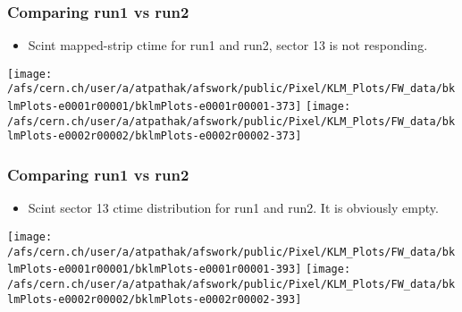 \documentclass{beamer}
\begin{document}
\begin{frame}
\frametitle{Comparing run1 vs run2}
\vspace*{.05cm}

\begin{itemize} 
\item {\small Scint mapped-strip ctime for run1 and run2, sector 13 is not responding.}
\end{itemize}

\begin{center}
\begin{normalsize}

\vspace*{-.2cm}
\begin{center}

\texttt{[image: /afs/cern.ch/user/a/atpathak/afswork/public/Pixel/KLM\_Plots/FW\_data/bklmPlots-e0001r00001/bklmPlots-e0001r00001-373]}
\texttt{[image: /afs/cern.ch/user/a/atpathak/afswork/public/Pixel/KLM\_Plots/FW\_data/bklmPlots-e0002r00002/bklmPlots-e0002r00002-373]} \\

\end{center}
\end{normalsize}
\end{center}
\end{frame}
\begin{frame}
\frametitle{Comparing run1 vs run2}
\vspace*{.05cm}

\begin{itemize} 
\item {\small Scint sector 13 ctime distribution for run1 and run2. It is obviously empty. }
\end{itemize}

\begin{center}
\begin{normalsize}

\vspace*{-.2cm}
\begin{center}

\texttt{[image: /afs/cern.ch/user/a/atpathak/afswork/public/Pixel/KLM\_Plots/FW\_data/bklmPlots-e0001r00001/bklmPlots-e0001r00001-393]}
\texttt{[image: /afs/cern.ch/user/a/atpathak/afswork/public/Pixel/KLM\_Plots/FW\_data/bklmPlots-e0002r00002/bklmPlots-e0002r00002-393]} \\

\end{center}
\end{normalsize}
\end{center}
\end{frame}
\end{document}
